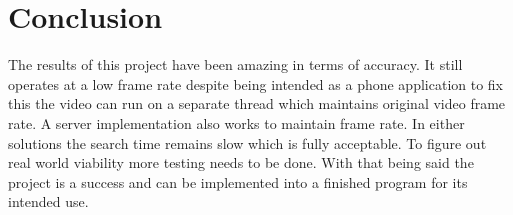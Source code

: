 \documentclass{article}
\begin{document}
\section{Conclusion}

The results of this project have been amazing in terms of accuracy. It still operates at a low frame rate despite being intended as a phone application to fix this the video can run on a separate thread which maintains original video frame rate.
A server implementation also works to maintain frame rate. In either solutions the search time remains slow which is fully acceptable. To figure out real world viability more testing needs to be done. 
With that being said the project is a success and can be implemented into a finished program for its intended use.




\newpage





\end{document}
